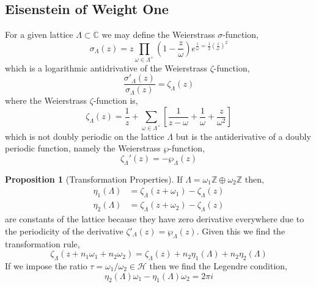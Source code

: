 \documentclass{article}
\newcommand{\Z}{\mathbb{Z}}
\newcommand{\C}{\mathbb{C}}
\theoremstyle{definition}
\newtheorem{proposition}[theorem]{Proposition}
\newenvironment{definition}[1][Definition:]{\begin{trivlist}
\item[\hskip \labelsep {\bfseries #1}]}{\end{trivlist}}
\newcommand{\half}{\mathcal{H}}
\begin{document}
\subsection{Eisenstein of Weight One}

\begin{definition}
For a given lattice $\Lambda \subset \C$ we may define the Weierstrass $\sigma$-function,
\[ \sigma_\Lambda(z) = z \prod_{\omega \in \Lambda^\times} \left( 1 - \frac{z}{\omega} \right) e^{\frac{z}{\omega} = \tfrac{1}{2}\left( \frac{z}{\omega} \right)^2} \]
which is a logarithmic antidrivative of the Weierstrass $\zeta$-function,
\[ \frac{\sigma'_{\Lambda}(z)}{\sigma_\Lambda(z)} = \zeta_\Lambda(z) \]
where the Weierstrass $\zeta$-function is,
\[ \zeta_\Lambda(z) = \frac{1}{z} + \sum_{\omega \in \Lambda^\times} \left[ \frac{1}{z - \omega} + \frac{1}{\omega} + \frac{z}{\omega^2}  \right] \]
which is not doubly periodic on the lattice $\Lambda$ but is the antiderivative of a doubly periodic function, namely the Weierstrass $\wp$-function,
\[ \zeta_\Lambda'(z) = - \wp_\Lambda(z) \]
\end{definition}

\begin{proposition}[Transformation Properties]
If $\Lambda = \omega_1 \Z \oplus \omega_2 \Z$ then,
\begin{align*}
\eta_1(\Lambda) & = \zeta_\Lambda(z + \omega_1) - \zeta_\Lambda(z)
\\
\eta_2(\Lambda) & = \zeta_\Lambda(z + \omega_2) - \zeta_\Lambda(z)
\end{align*}
are constants of the lattice because they have zero derivative everywhere due to the periodicity of the derivative $\zeta'_\Lambda(z) = \wp_\Lambda(z)$. Given this we find the transformation rule,
\[ \zeta_\Lambda(z + n_1 \omega_1 + n_2 \omega_2) = \zeta_\Lambda(z) + n_2 \eta_1(\Lambda) + n_2 \eta_2(\Lambda) \]
If we impose the ratio $\tau = \omega_1 / \omega_2 \in \half$ then we find the Legendre condition,
\[ \eta_2(\Lambda) \omega_1 - \eta_1(\Lambda) \omega_2 = 2 \pi i \]  
\end{proposition}
\end{document}
